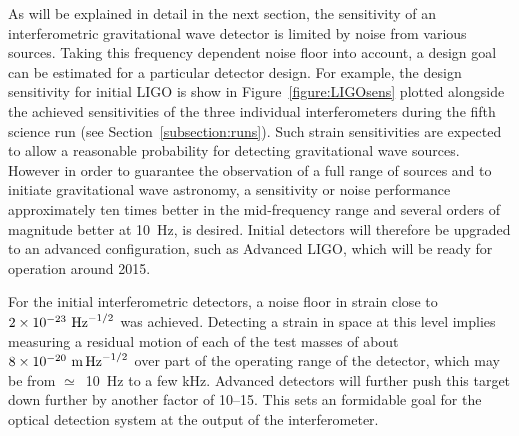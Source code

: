\documentclass{article}
\begin{document}
As will be explained in detail in the next section, the sensitivity of an
interferometric gravitational wave detector is limited by noise from various
sources. Taking this frequency dependent noise floor into account, a design goal
can be estimated for a particular detector design. For example, the design
sensitivity for initial LIGO is show in Figure~\ref{figure:LIGOsens} plotted
alongside the achieved sensitivities of the three individual interferometers
during the fifth science run (see Section~\ref{subsection:runs}). Such strain
sensitivities are expected to allow a reasonable probability for detecting
gravitational wave sources. However in order to guarantee the observation
of a full range of sources and to initiate gravitational wave astronomy, a
sensitivity or noise performance approximately ten times better in the
mid-frequency range and several orders of magnitude better at 10~Hz, is desired.
Initial detectors will therefore be upgraded to an advanced configuration, such
as Advanced LIGO, which will be ready for operation around 2015.


For the initial interferometric detectors, a noise floor in strain close to $2
\times 10^{-23}~{\rm Hz}^{-1/2}$ was achieved. Detecting a strain in space at
this level implies measuring a residual motion of each of the test masses of
about $8 \times 10^{-20}~{\rm m}\,{\rm Hz}^{-1/2}$ over part of the operating
range of the detector, which may be from $\simeq$~10~Hz to a few kHz. Advanced
detectors will further push this target down further by another factor of
10--15. This sets an formidable goal for the optical detection system at the
output of the interferometer.
\end{document}
